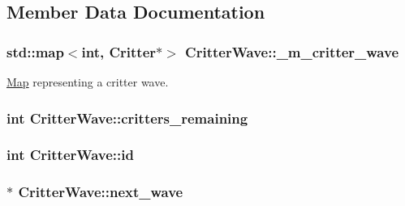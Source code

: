 \subsection{Member Data Documentation}
\hypertarget{class_critter_wave_a82475869f718062181e545afb8277217}{
\subsubsection[{\+\_\+m\+\_\+critter\+\_\+wave}]{\setlength{\rightskip}{0pt plus 5cm}std\+::map$<$int, {\bf Critter}$\ast$$>$ Critter\+Wave\+::\+\_\+m\+\_\+critter\+\_\+wave\hspace{0.3cm}{\ttfamily [private]}}}\label{class_critter_wave_a82475869f718062181e545afb8277217}


\hyperlink{class_map}{Map} representing a critter wave. 

\hypertarget{class_critter_wave_a6fea77f30895b8ac455dd25a4287abd6}{
\subsubsection[{critters\+\_\+remaining}]{\setlength{\rightskip}{0pt plus 5cm}int Critter\+Wave\+::critters\+\_\+remaining\hspace{0.3cm}{\ttfamily [private]}}}\label{class_critter_wave_a6fea77f30895b8ac455dd25a4287abd6}
\hypertarget{class_critter_wave_aa476fc7af49dfb42fce07da5e726bbb2}{
\subsubsection[{id}]{\setlength{\rightskip}{0pt plus 5cm}int Critter\+Wave\+::id\hspace{0.3cm}{\ttfamily [private]}}}\label{class_critter_wave_aa476fc7af49dfb42fce07da5e726bbb2}
\hypertarget{class_critter_wave_a86ca5704a4a52a135fda195097dc4dd9}{
\subsubsection[{next\+\_\+wave}]{$\ast$ Critter\+Wave\+::next\+\_\+wave}}\label{class_critter_wave_a86ca5704a4a52a135fda195097dc4dd9}


